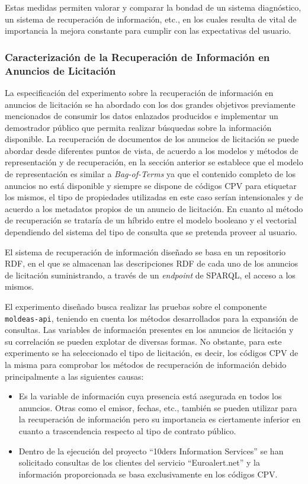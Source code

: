 Estas medidas permiten valorar y comparar la bondad de un sistema diagnóstico, un sistema de recuperación de información, etc., 
en los cuales resulta de vital de importancia la mejora constante para cumplir con las expectativas del usuario.

\subsubsection{Caracterización de la Recuperación de Información en Anuncios de Licitación}
La especificación del experimento sobre la recuperación de información en anuncios de licitación se ha abordado 
con los dos grandes objetivos previamente mencionados de consumir los datos enlazados producidos e implementar 
un demostrador público que permita realizar búsquedas sobre la información disponible. La recuperación 
de documentos de los anuncios de licitación se puede abordar desde diferentes puntos de vista, de acuerdo 
a los modelos y métodos de representación y de recuperación, en la sección anterior se establece que 
el modelo de representación es similar a \textit{Bag-of-Terms} ya que el contenido completo de los anuncios 
no está disponible y siempre se dispone de códigos \gls{CPV} para etiquetar los mismos, el tipo de propiedades 
utilizadas en este caso serían intensionales y de acuerdo a los metadatos propios de un anuncio de licitación. En cuanto al método de 
recuperación se trataría de un híbrido entre el modelo booleano y el vectorial dependiendo del sistema del tipo 
de consulta que se pretenda proveer al usuario.

El sistema de recuperación de información diseñado se basa en un repositorio \gls{RDF}, en el que se almacenan las descripciones 
RDF de cada uno de los anuncios de licitación suministrando, a través de un \textit{endpoint} de \gls{SPARQL}, el acceso a los 
mismos. 

El experimento diseñado busca realizar las pruebas sobre el componente \texttt{moldeas-api}, teniendo en cuenta 
los métodos desarrollados para la expansión de consultas. Las variables de información presentes en los anuncios 
de licitación y su correlación se pueden explotar de diversas formas. No obstante, para este experimento 
se ha seleccionado el tipo de licitación, es decir, los códigos \gls{CPV} de la misma para comprobar los métodos de 
recuperación de información debido principalmente a las siguientes causas:

\begin{itemize}
 \item Es la variable de información cuya presencia está asegurada en todos los anuncios. Otras como el emisor, fechas, etc., también 
se pueden utilizar para la recuperación de información pero su importancia es ciertamente inferior en cuanto a trascendencia respecto 
al tipo de contrato público.
\item Dentro de la ejecución del proyecto ``10ders Information Services'' se han solicitado consultas de los clientes del 
servicio ``Euroalert.net'' y la información proporcionada se basa exclusivamente en los códigos CPV.
\end{itemize}

